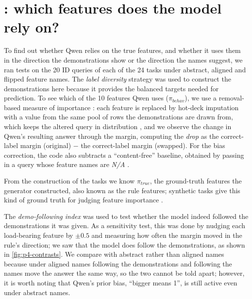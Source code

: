 \section{: which features does the model rely on?}
\label{sec:shift-rq3}
To find out whether Qwen relies on the true features, and whether it uses them in the direction the demonstrations show or the direction the names suggest, we ran tests on the 20 ID queries of each of the 24 tasks under abstract, aligned and flipped feature names. The \emph{label diversity} strategy was used to construct the demonstrations here because it provides the balanced targets needed for prediction. To see which of the 10 features Qwen uses ($\pi_{behav}$), we use a removal-based measure of importance \citep{breiman2001random,covert2021explaining}: each feature is replaced by hot-deck imputation \citep{andridge2010review} with a value from the same pool of rows the demonstrations are drawn from, which keeps the altered query in distribution \citep{zhu2026faithfulness}, and we observe the change in Qwen's resulting answer through the margin, computing the \emph{drop} as the correct-label margin (original) $-$ the correct-label margin (swapped). For the bias correction, the code also subtracts a ``content-free'' baseline, obtained by passing in a query whose feature names are \emph{N/A} \citep{zhao2021calibrate}.

From the construction of the tasks we know $\pi_{true}$, the ground-truth features the generator constructed, also known as the rule features; synthetic tasks give this kind of ground truth for judging feature importance \citep{liu2021synthetic}.


The \emph{demo-following index} was used to test whether the model indeed followed the demonstrations it was given. As a sensitivity test, this was done by nudging each load-bearing feature by $\pm 0.5$ and measuring how often the margin moved in the rule's direction; we saw that the model does follow the demonstrations, as shown in \autoref{fig:p4-contrasts}. We compare with abstract rather than aligned names because under aligned names following the demonstrations and following the names move the answer the same way, so the two cannot be told apart; however, it is worth noting that Qwen's prior bias, ``bigger means 1'', is still active even under abstract names.


